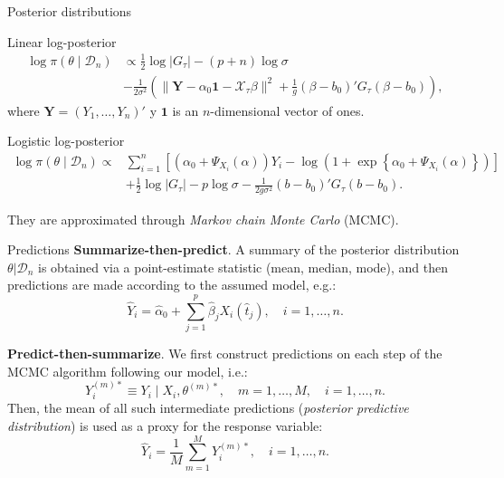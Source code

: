 \documentclass[10pt, english, professionalfonts]{beamer}
\newcommand\maroon[1]{\color{mLightBrown}#1\color{mDarkTeal}}
\begin{document}
\begin{frame}{Posterior distributions}
  \begin{block}{Linear log-posterior}
    \vspace{-1em}
    \begin{align*}
  \log \pi(\theta\mid \mathcal D_n) &\propto \frac{1}{2}\log |G_\tau| - (p+n)\log \sigma\\
  &-\frac{1}{2\sigma^2} \left(\|\boldsymbol{Y}-\alpha_0\boldsymbol{1} - \mathcal X_\tau\beta\|^2 + \frac{1}{g}(\beta - b_0)'G_\tau(\beta - b_0) \right),
\end{align*}
where \(\bm Y=(Y_1,\dots,Y_n)'\) y \(\bm{1}\) is an \(n\)-dimensional vector of ones.
  \end{block}

  \begin{block}{Logistic log-posterior}
      \vspace{-1em}
    \begin{align*}
  \log \pi(\theta \mid \mathcal D_n) \propto {} & \sum_{i=1}^n \left[ \left(\alpha_0 + \Psi_{X_i}(\alpha)\right)Y_i - \log\left(1 + \exp\left\{\alpha_0 + \Psi_{X_i}(\alpha)\right\}\right)\right]\\
  \quad &+ \frac{1}{2}\log |G_\tau| - p\log \sigma -\frac{1}{2g\sigma^2} (b - b_0)'G_\tau(b - b_0).
\end{align*}
  \end{block}
  They are approximated through \textit{Markov chain Monte Carlo} (MCMC).
\end{frame}

%
%

\begin{frame}{Predictions}
  \textbf{Summarize-then-predict}. A summary of the posterior distribution \(\theta| \mathcal D_n\) is obtained via a point-estimate statistic (mean, median, mode), and then predictions are made according to the assumed model, e.g.:
  \[
  \hat Y_i =\hat \alpha_0 + \sum_{j=1}^p \hat \beta_j X_i(\hat t_j), \quad i=1,\dots, n.
  \]

  \textbf{Predict-then-summarize}. We first construct predictions on each step of the MCMC algorithm following our model, i.e.:
  \[
    Y_i^{(m)*} \equiv Y_i \mid X_i, \theta^{(m)*}, \quad m=1,\dots,M, \quad i=1,\dots, n.
  \]
  Then, the mean of all such intermediate predictions (\textit{posterior predictive distribution}) is used as a proxy for the response variable:
  \[
    \hat Y_i = \frac{1}{M}\sum_{m=1}^M Y_i^{(m)*}, \quad i=1,\dots, n.
  \]

\end{frame}
\end{document}
